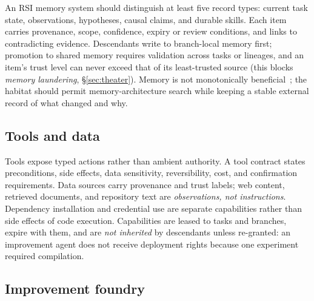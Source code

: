 \documentclass[11pt,a4paper]{article}
\begin{document}
An RSI memory system should distinguish at least five record types: current task state, observations, hypotheses, causal claims, and durable skills. Each item carries provenance, scope, confidence, expiry or review conditions, and links to contradicting evidence. Descendants write to branch-local memory first; promotion to shared memory requires validation across tasks or lineages, and an item's trust level can never exceed that of its least-trusted source (this blocks \emph{memory laundering}, \S\ref{sec:theater}). Memory is not monotonically beneficial~\cite{automem,recuris}; the habitat should permit memory-architecture search while keeping a stable external record of what changed and why.

\subsection{Tools and data}

Tools expose typed actions rather than ambient authority. A tool contract states preconditions, side effects, data sensitivity, reversibility, cost, and confirmation requirements. Data sources carry provenance and trust labels; web content, retrieved documents, and repository text are \emph{observations, not instructions}. Dependency installation and credential use are separate capabilities rather than side effects of code execution. Capabilities are leased to tasks and branches, expire with them, and are \emph{not inherited} by descendants unless re-granted: an improvement agent does not receive deployment rights because one experiment required compilation.

\subsection{Improvement foundry}\label{sec:foundry}
\end{document}
